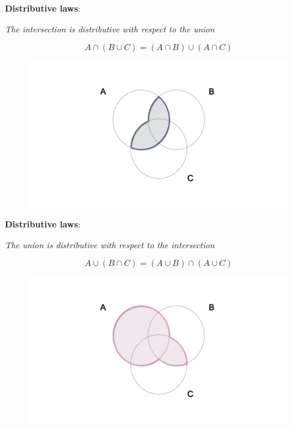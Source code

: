 \documentclass[notes=show]{beamer}\usepackage[]{graphicx}\usepackage[]{color}
\begin{document}
\begin{frame}{\secname}
  \textbf{Distributive laws}:
  \begin{center}
  \textit{The intersection is distributive with respect to the union}
  \end{center}
  $$A \cap (B \cup C) = (A \cap B) \cup (A\cap C)$$
  \begin{figure}[h!]
  \centering
  \includegraphics[scale=0.15]{img/charts/charts.008.png}
  \end{figure}
\end{frame}

\begin{frame}{\secname}
  \textbf{Distributive laws}:
  \begin{center}
  \textit{The union is distributive with respect to the intersection}
  \end{center}
  $$A \cup (B \cap C) = (A\cup B) \cap (A \cup C)$$
  \begin{figure}[h!]
  \centering
  \includegraphics[scale=0.15]{img/charts/charts.009.png}
  \end{figure}
\end{frame}
\end{document}
